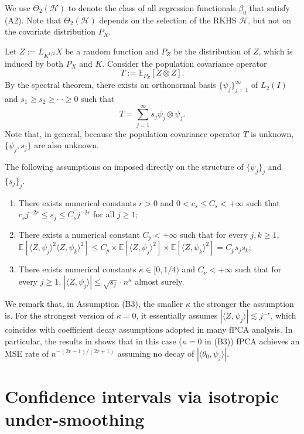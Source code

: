 \documentclass[11pt,a4paper]{article}
\theoremstyle{definition}
\theoremstyle{plain}
\theoremstyle{remark}
\newcommand{\mH}{\mathcal H}
\begin{document}
We use $\Theta_2(\mH)$ to denote the class of all regression functionals $\beta_0$ that satisfy (A2). Note that $\Theta_2(\mH)$ depends on the selection of the RKHS $\mH$, but not on the covariate distribution $P_X$.

Let $Z:=L_{K^{1/2}}X$ be a random function and $P_Z$ be the distribution of $Z$, which is induced by both $P_X$ and $K$. Consider the population covariance operator
$$
T := \mathbb E_{P_Z}\left[Z\otimes Z\right].
$$
By the spectral theorem, there exists an orthonormal basis $\{\psi_j\}_{j=1}^{\infty}$ of $L_2(I)$ and $s_1\geq s_2\geq\cdots\geq 0$ such that
\begin{equation}
T = \sum_{j=1}^{\infty} s_j\psi_j\otimes\psi_j.
\label{eq:specT}
\end{equation}
Note that, in general, because the population covariance operator $T$ is unknown, $\{\psi_j,s_j\}$ are also unknown.

The following assumptions on imposed directly on the structure of $\{\psi_j\}_j$ and $\{s_j\}_j$.
\begin{enumerate}
\item[(B1)] There exists numerical constants $r>0$ and $0<c_s\leq C_s<+\infty$ such that $c_s j^{-2r}\leq s_j\leq C_sj^{-2r}$ for all $j\geq 1$;
\item[(B2)] There exists a numerical constant $C_p<+\infty$ such that for every $j,k\geq 1$, $\mathbb E[\langle Z,\psi_j\rangle^2\langle Z,\psi_k\rangle^2] \leq C_p\times \mathbb E[\langle Z,\psi_j\rangle^2]\times \mathbb E[\langle Z,\psi_k\rangle^2]= C_ps_js_k$;
\item[(B3)] There exists numerical constants $\kappa\in[0,1/4)$ and $C_\nu<+\infty$ such that for every $j\geq 1$, $|\langle Z,\psi_j\rangle| \leq \sqrt{s_j}\cdot n^{\kappa}$ almost surely.
\end{enumerate}

We remark that, in Assumption (B3), the smaller $\kappa$ the stronger the assumption is. For the strongest version of $\kappa=0$, it essentially assumes $|\langle Z,\psi_j\rangle|\lesssim j^{-r}$,
which coincides with coefficient decay assumptions adopted in many fPCA analysis.
{\color{red}In particular, the results in \cite{cai2006prediction} shows that in this case ($\kappa=0$ in (B3)) fPCA achieves an MSE rate of $n^{-(2r-1)/(2r+1)}$ assuming no decay of $|\langle\theta_0,\psi_j\rangle|$.}

\section{Confidence intervals via isotropic under-smoothing}
\end{document}
